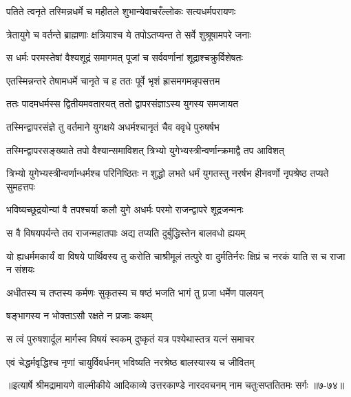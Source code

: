 \twolineshloka
{पतिते त्वनृते तस्मिन्नधर्मे च महीतले}
{शुभान्येवाचरँल्लोकः सत्यधर्मपरायणः} %

\twolineshloka
{त्रेतायुगे च वर्तन्ते ब्राह्मणाः क्षत्रियाश्च ये}
{तपोऽतप्यन्त ते सर्वे शुश्रूषामपरे जनाः} %

\twolineshloka
{स धर्मः परमस्तेषां वैश्यशूद्रं समागमत्}
{पूजां च सर्ववर्णानां शूद्राश्चक्रुर्विशेषतः} %

\twolineshloka
{एतस्मिन्नन्तरे तेषामधर्मे चानृते च ह}
{ततः पूर्वे भृशं ह्रासमगमन्नृपसत्तम} %

\twolineshloka
{ततः पादमधर्मस्स द्वितीयमवतारयत्}
{ततो द्वापरसंज्ञाऽस्य युगस्य समजायत} %

\twolineshloka
{तस्मिन्द्वापरसंज्ञे तु वर्तमाने युगक्षये}
{अधर्मश्चानृतं चैव ववृधे पुरुषर्षभ} %

\twolineshloka
{तस्मिन्द्वापरसङ्ख्याते तपो वैश्यान्समाविशत्}
{त्रिभ्यो युगेभ्यस्त्रीन्वर्णान्क्रमाद्वै तप आविशत्} %

\threelineshloka
{त्रिभ्यो युगेभ्यस्त्रीन्वर्णान्धर्मश्च परिनिष्ठितः}
{न शुद्धो लभते धर्मं युगतस्तु नरर्षभ}
{हीनवर्णो नृपश्रेष्ठ तप्यते सुमहत्तपः} %

\twolineshloka
{भविष्यच्छूद्रयोन्यां वै तपश्चर्या कलौ युगे}
{अधर्मः परमो राजन्द्वापरे शूद्रजन्मनः} %

\twolineshloka
{स वै विषयपर्यन्ते तव राजन्महातपाः}
{अद्य तप्यति दुर्बुद्धिस्तेन बालवधो ह्ययम्} %

\threelineshloka
{यो ह्यधर्ममकार्यं वा विषये पार्थिवस्य तु}
{करोति चाश्रीमूलं तत्पुरे वा दुर्मतिर्नरः}
{क्षिप्रं च नरकं याति स च राजा न संशयः} %

\twolineshloka
{अधीतस्य च तप्तस्य कर्मणः सुकृतस्य च}
{षष्ठं भजति भागं तु प्रजा धर्मेण पालयन्} %

\onelineshloka
{षङ्भागस्य न भोक्ताऽसौ रक्षते न प्रजाः कथम्} %

\twolineshloka
{स त्वं पुरुषशार्दूल मार्गस्व विषयं स्वकम्}
{दुष्कृतं यत्र पश्येथास्तत्र यत्नं समाचर} %

\twolineshloka
{एवं चेद्धर्मवृद्धिश्च नृणां चायुर्विवर्धनम्}
{भविष्यति नरश्रेष्ठ बालस्यास्य च जीवितम्} %


॥इत्यार्षे श्रीमद्रामायणे वाल्मीकीये आदिकाव्ये उत्तरकाण्डे नारदवचनम् नाम चतुःसप्ततितमः सर्गः ॥७-७४॥
